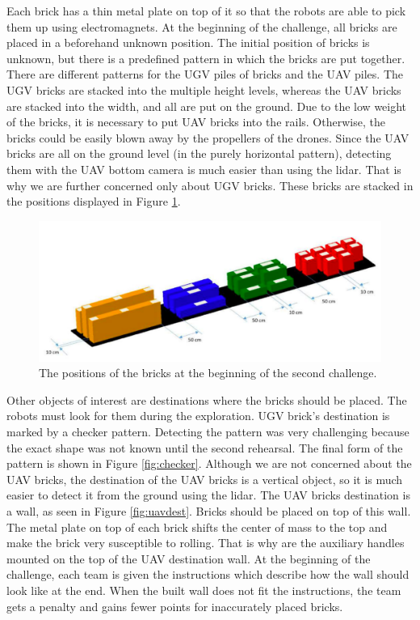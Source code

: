 Each brick has a thin metal plate on top of it so that the robots are able to pick them up using electromagnets. At the beginning of the challenge, all bricks are placed in a beforehand unknown position. The initial position of bricks is unknown, but there is a predefined pattern in which the bricks are put together. There are different patterns for the UGV piles of bricks and the UAV piles. The UGV bricks are stacked into the multiple height levels, whereas the UAV bricks are stacked into the width, and all are put on the ground. Due to the low weight of the bricks, it is necessary to put UAV bricks into the rails. Otherwise, the bricks could be easily blown away by the propellers of the drones. Since the UAV bricks are all on the ground level (in the purely horizontal pattern), detecting them with the UAV bottom camera is much easier than using the lidar. That is why we are further concerned only about UGV bricks. These bricks are stacked in the positions displayed in Figure \ref{fig:piledef}.

\begin{figure}[H]

\centering
\includegraphics[scale=0.35]{fig/initial_layout.png}
\caption[Initial brick layout]{The positions of the bricks at the beginning of the second challenge.}
\label{fig:piledef}

\end{figure}

Other objects of interest are destinations where the bricks should be placed. The robots must look for them during the exploration. UGV brick's destination is marked by a checker pattern. Detecting the pattern was very challenging because the exact shape was not known until the second rehearsal. The final form of the pattern is shown in Figure \ref{fig:checker}. Although we are not concerned about the UAV bricks, the destination of the UAV bricks is a vertical object, so it is much easier to detect it from the ground using the lidar. The UAV bricks destination is a wall, as seen in Figure \ref{fig:uavdest}. Bricks should be placed on top of this wall. The metal plate on top of each brick shifts the center of mass to the top and make the brick very susceptible to rolling. That is why are the auxiliary handles mounted on the top of the UAV destination wall. At the beginning of the challenge, each team is given the instructions which describe how the wall should look like at the end. When the built wall does not fit the instructions, the team gets a penalty and gains fewer points for inaccurately placed bricks.


